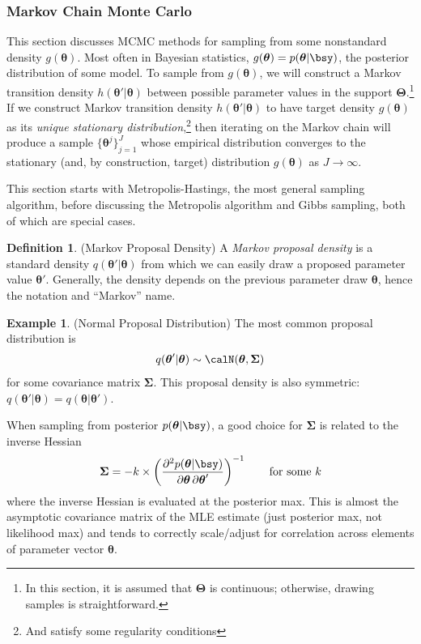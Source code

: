 \documentclass[12pt]{article}
\theoremstyle{plain}
\theoremstyle{definition}
\newtheorem{defn}[thm]{Definition}
\newtheorem{ex}[thm]{Example}
\theoremstyle{remark}
\newcommand{\ra}{\rightarrow}
\newcommand{\bstheta}{\boldsymbol{\theta}}
\newcommand{\bsTheta}{\boldsymbol{\Theta}}
\newcommand{\bsSigma}{\boldsymbol{\Sigma}}
\begin{document}
\clearpage
\subsubsection{Markov Chain Monte Carlo}

This section discusses MCMC methods for sampling from some nonstandard
density $g(\bstheta)$.
Most often in Bayesian statistics, $g(\bstheta)=p(\bstheta|\bsy)$, the
posterior distribution of some model.
To sample from $g(\bstheta)$, we will construct a Markov transition
density $h(\bstheta'|\bstheta)$ between possible parameter values in
the support $\bsTheta$.\footnote{%
  In this section, it is assumed that $\bsTheta$ is continuous;
  otherwise, drawing samples is straightforward.
}
If we construct Markov transition density $h(\bstheta'|\bstheta)$ to
have target density $g(\bstheta)$ as its
\emph{unique stationary distribution},\footnote{%
  And satisfy some regularity conditions
}
then iterating on the Markov chain will produce a sample
$\{\bstheta^j\}_{j=1}^J$ whose empirical distribution converges to the
stationary (and, by construction, target) distribution $g(\bstheta)$ as
$J\ra\infty$.

This section starts with Metropolis-Hastings, the most general sampling
algorithm, before discussing the Metropolis algorithm and Gibbs
sampling, both of which are special cases.

\begin{defn}(Markov Proposal Density)
A \emph{Markov proposal density} is a standard density
$q(\bstheta'|\bstheta)$ from which we can easily draw a proposed
parameter value $\bstheta'$. Generally, the density depends on the
previous parameter draw $\bstheta$, hence the notation and ``Markov''
name.
\end{defn}

\begin{ex}(Normal Proposal Distribution)
The most common proposal distribution is
\begin{align*}
  q(\bstheta'|\bstheta)
  \sim \calN(\bstheta,\bsSigma)
\end{align*}
for some covariance matrix $\bsSigma$.
This proposal density is also symmetric:
$q(\bstheta'|\bstheta)=q(\bstheta|\bstheta')$.

When sampling from posterior $p(\bstheta|\bsy)$, a good choice for
$\bsSigma$ is related to the inverse Hessian
\begin{align*}
  \bsSigma =
  -k \times
  \left(
  \frac{\partial^2 p(\bstheta|\bsy)}{%
    \partial \bstheta\,\partial\bstheta'}
  \right)^{-1}
  \qquad
  \text{for some $k$}
\end{align*}
where the inverse Hessian is evaluated at the posterior max.
This is almost the asymptotic covariance matrix of the MLE estimate
(just posterior max, not likelihood max) and tends to correctly
scale/adjust for correlation across elements of parameter vector
$\bstheta$.
\end{ex}
\end{document}
